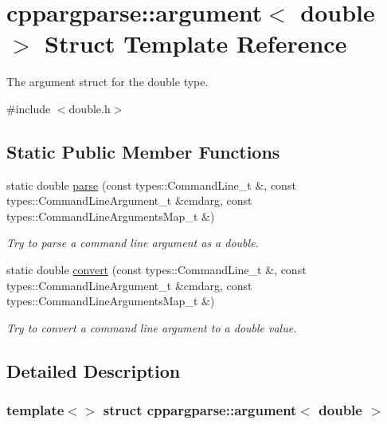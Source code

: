 \hypertarget{structcppargparse_1_1argument_3_01double_01_4}{}\section{cppargparse\+:\+:argument$<$ double $>$ Struct Template Reference}
\label{structcppargparse_1_1argument_3_01double_01_4}


The argument struct for the double type.  




{\ttfamily \#include $<$double.\+h$>$}

\subsection*{Static Public Member Functions}
\begin{DoxyCompactItemize}
\item 
static double \hyperlink{structcppargparse_1_1argument_3_01double_01_4_afc18801cd4a57b636d65d8e223482f45}{parse} (const types\+::\+Command\+Line\+\_\+t \&, const types\+::\+Command\+Line\+Argument\+\_\+t \&cmdarg, const types\+::\+Command\+Line\+Arguments\+Map\+\_\+t \&)
\begin{DoxyCompactList}\small\item\em Try to parse a command line argument as a double. \end{DoxyCompactList}\item 
static double \hyperlink{structcppargparse_1_1argument_3_01double_01_4_a9d3b588191523c720868cd72e05b6261}{convert} (const types\+::\+Command\+Line\+\_\+t \&, const types\+::\+Command\+Line\+Argument\+\_\+t \&cmdarg, const types\+::\+Command\+Line\+Arguments\+Map\+\_\+t \&)
\begin{DoxyCompactList}\small\item\em Try to convert a command line argument to a double value. \end{DoxyCompactList}\end{DoxyCompactItemize}


\subsection{Detailed Description}
\subsubsection*{template$<$$>$\newline
struct cppargparse\+::argument$<$ double $>$}

